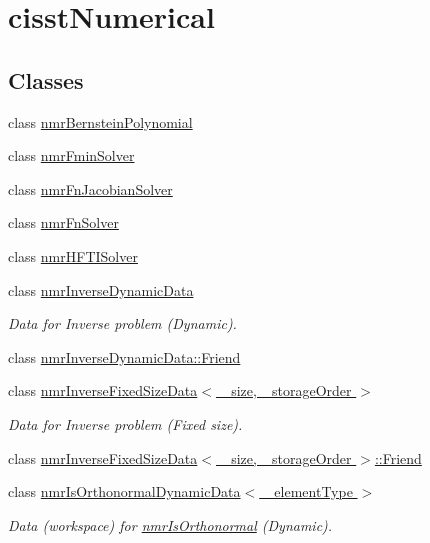 \hypertarget{group__cisst_numerical}{}\section{cisst\+Numerical}
\label{group__cisst_numerical}
\subsection*{Classes}
\begin{DoxyCompactItemize}
\item 
class \hyperlink{classnmr_bernstein_polynomial}{nmr\+Bernstein\+Polynomial}
\item 
class \hyperlink{classnmr_fmin_solver}{nmr\+Fmin\+Solver}
\item 
class \hyperlink{classnmr_fn_jacobian_solver}{nmr\+Fn\+Jacobian\+Solver}
\item 
class \hyperlink{classnmr_fn_solver}{nmr\+Fn\+Solver}
\item 
class \hyperlink{classnmr_h_f_t_i_solver}{nmr\+H\+F\+T\+I\+Solver}
\item 
class \hyperlink{classnmr_inverse_dynamic_data}{nmr\+Inverse\+Dynamic\+Data}
\begin{DoxyCompactList}\small\item\em Data for Inverse problem (Dynamic). \end{DoxyCompactList}\item 
class \hyperlink{classnmr_inverse_dynamic_data_1_1_friend}{nmr\+Inverse\+Dynamic\+Data\+::\+Friend}
\item 
class \hyperlink{classnmr_inverse_fixed_size_data}{nmr\+Inverse\+Fixed\+Size\+Data$<$ \+\_\+size, \+\_\+storage\+Order $>$}
\begin{DoxyCompactList}\small\item\em Data for Inverse problem (Fixed size). \end{DoxyCompactList}\item 
class \hyperlink{classnmr_inverse_fixed_size_data_1_1_friend}{nmr\+Inverse\+Fixed\+Size\+Data$<$ \+\_\+size, \+\_\+storage\+Order $>$\+::\+Friend}
\item 
class \hyperlink{classnmr_is_orthonormal_dynamic_data}{nmr\+Is\+Orthonormal\+Dynamic\+Data$<$ \+\_\+element\+Type $>$}
\begin{DoxyCompactList}\small\item\em Data (workspace) for \hyperlink{nmr_is_orthonormal_8h_acf0ff1e2dbe0c988db04d9db1e2e7697}{nmr\+Is\+Orthonormal} (Dynamic). \end{DoxyCompactList}\item 

\end{DoxyCompactItemize}
